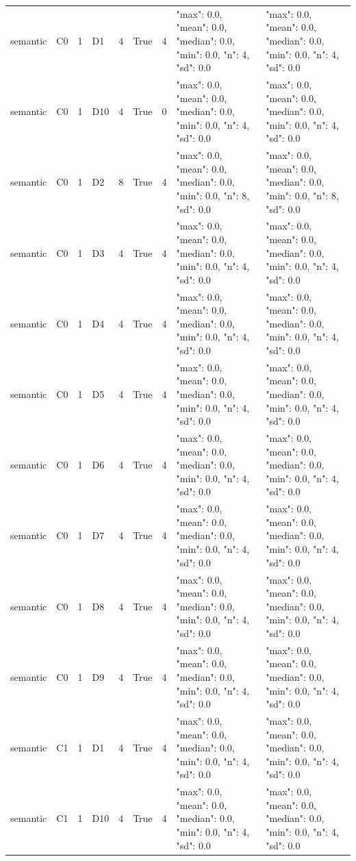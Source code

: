 \begin{tabular}{lllllllll}
semantic & C0 & 1 & D1 & 4 & True & 4 & {"max": 0.0, "mean": 0.0, "median": 0.0, "min": 0.0, "n": 4, "sd": 0.0} & {"max": 0.0, "mean": 0.0, "median": 0.0, "min": 0.0, "n": 4, "sd": 0.0} \\
semantic & C0 & 1 & D10 & 4 & True & 0 & {"max": 0.0, "mean": 0.0, "median": 0.0, "min": 0.0, "n": 4, "sd": 0.0} & {"max": 0.0, "mean": 0.0, "median": 0.0, "min": 0.0, "n": 4, "sd": 0.0} \\
semantic & C0 & 1 & D2 & 8 & True & 4 & {"max": 0.0, "mean": 0.0, "median": 0.0, "min": 0.0, "n": 8, "sd": 0.0} & {"max": 0.0, "mean": 0.0, "median": 0.0, "min": 0.0, "n": 8, "sd": 0.0} \\
semantic & C0 & 1 & D3 & 4 & True & 4 & {"max": 0.0, "mean": 0.0, "median": 0.0, "min": 0.0, "n": 4, "sd": 0.0} & {"max": 0.0, "mean": 0.0, "median": 0.0, "min": 0.0, "n": 4, "sd": 0.0} \\
semantic & C0 & 1 & D4 & 4 & True & 4 & {"max": 0.0, "mean": 0.0, "median": 0.0, "min": 0.0, "n": 4, "sd": 0.0} & {"max": 0.0, "mean": 0.0, "median": 0.0, "min": 0.0, "n": 4, "sd": 0.0} \\
semantic & C0 & 1 & D5 & 4 & True & 4 & {"max": 0.0, "mean": 0.0, "median": 0.0, "min": 0.0, "n": 4, "sd": 0.0} & {"max": 0.0, "mean": 0.0, "median": 0.0, "min": 0.0, "n": 4, "sd": 0.0} \\
semantic & C0 & 1 & D6 & 4 & True & 4 & {"max": 0.0, "mean": 0.0, "median": 0.0, "min": 0.0, "n": 4, "sd": 0.0} & {"max": 0.0, "mean": 0.0, "median": 0.0, "min": 0.0, "n": 4, "sd": 0.0} \\
semantic & C0 & 1 & D7 & 4 & True & 4 & {"max": 0.0, "mean": 0.0, "median": 0.0, "min": 0.0, "n": 4, "sd": 0.0} & {"max": 0.0, "mean": 0.0, "median": 0.0, "min": 0.0, "n": 4, "sd": 0.0} \\
semantic & C0 & 1 & D8 & 4 & True & 4 & {"max": 0.0, "mean": 0.0, "median": 0.0, "min": 0.0, "n": 4, "sd": 0.0} & {"max": 0.0, "mean": 0.0, "median": 0.0, "min": 0.0, "n": 4, "sd": 0.0} \\
semantic & C0 & 1 & D9 & 4 & True & 4 & {"max": 0.0, "mean": 0.0, "median": 0.0, "min": 0.0, "n": 4, "sd": 0.0} & {"max": 0.0, "mean": 0.0, "median": 0.0, "min": 0.0, "n": 4, "sd": 0.0} \\
semantic & C1 & 1 & D1 & 4 & True & 4 & {"max": 0.0, "mean": 0.0, "median": 0.0, "min": 0.0, "n": 4, "sd": 0.0} & {"max": 0.0, "mean": 0.0, "median": 0.0, "min": 0.0, "n": 4, "sd": 0.0} \\
semantic & C1 & 1 & D10 & 4 & True & 4 & {"max": 0.0, "mean": 0.0, "median": 0.0, "min": 0.0, "n": 4, "sd": 0.0} & {"max": 0.0, "mean": 0.0, "median": 0.0, "min": 0.0, "n": 4, "sd": 0.0} \\

\end{tabular}
